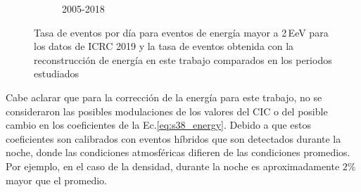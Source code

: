 \begin{figure}[H]
\begin{subfigure}[b]{0.5\textwidth}
                \caption{2005-2018}\label{fig:2EeV_expected_05_18}
                \end{subfigure}%
                \caption{Tasa de eventos por día para eventos de energía mayor a 2\,EeV para los datos de ICRC 2019 y la tasa de eventos obtenida con la reconstrucción de energía en este trabajo comparados en los periodos estudiados}\label{final}
        \end{figure}
Cabe aclarar que para la corrección de la energía para este trabajo, no se consideraron las posibles modulaciones de los valores del CIC o del posible cambio en los coeficientes de la Ec.\ref{eq:s38_energy}. Debido a que estos coeficientes son calibrados con eventos híbridos que son detectados durante la noche, donde las condiciones atmosféricas difieren de las condiciones promedios. Por ejemplo, en el caso de la densidad, durante la noche es aproximadamente $2\%$ mayor que el promedio.





